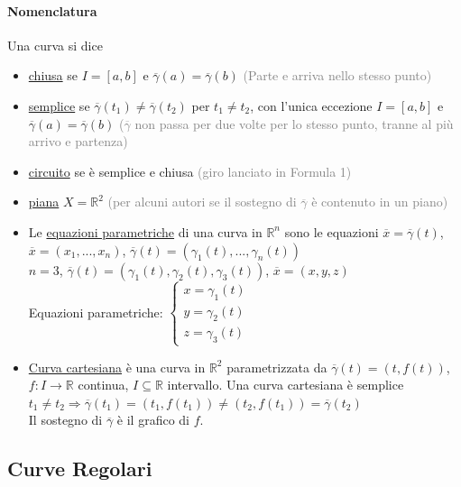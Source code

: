 \documentclass{article}
\newcommand{\R}{\mathbb{R}}
\begin{document}
\paragraph{{Nomenclatura}}
Una curva si dice
\begin{itemize}
    \item \underline{chiusa} se $I = [a,b]$ e $\overline{\gamma}(a)=\overline{\gamma}(b)$ \textcolor{grey}{(Parte e arriva nello stesso punto)}
    \item \underline{semplice} se $\overline{\gamma}(t_1)\neq \overline{\gamma}(t_2)$ per $t_1 \neq t_2$, con l'unica eccezione $I =[a,b]$ e $\overline{\gamma}(a)=\overline{\gamma}(b)$ \textcolor{grey}{($\overline{\gamma}$ non passa per due volte per lo stesso punto, tranne al più arrivo e partenza)}
    \item \underline{circuito} se è semplice e chiusa \textcolor{grey}{(giro lanciato in Formula 1)}
    \item \underline{piana} $X =\R^2$ \textcolor{grey}{(per alcuni autori se il sostegno di $\overline{\gamma}$ è contenuto in un piano)}
\end{itemize}
\begin{itemize}
\item Le \underline{equazioni parametriche} di una curva in $\R^n$ sono le equazioni $\overline{x}=\overline{\gamma}(t)$, $\overline{x}=(x_1,...,x_n)$, $\overline{\gamma}(t)=(\gamma_1(t),...,\gamma_n(t))$\\
$n=3$, $\overline{\gamma}(t)=(\gamma_1(t),\gamma_2(t),\gamma_3 (t))$, $\overline{x}=(x,y,z)$\\
Equazioni parametriche:
$\begin{cases}
    x=\gamma_1(t)\\
    y=\gamma_2(t)\\
    z=\gamma_3(t)
\end{cases}$
\item \underline{Curva cartesiana} è una curva in $\R^2$ parametrizzata da $\overline{\gamma}(t)=(t,f(t))$, $f:I \rightarrow \R$ continua, $I \subseteq \R$ intervallo. Una curva cartesiana è semplice\\
$t_1 \neq t_2 \Rightarrow \overline{\gamma}(t_1)=(t_1,f(t_1))\neq (t_2,f(t_1))=\overline{\gamma}(t_2)$\\
Il sostegno di $\overline{\gamma}$ è il grafico di $f$.
 \end{itemize}

\subsection{{Curve Regolari}}
\end{document}
